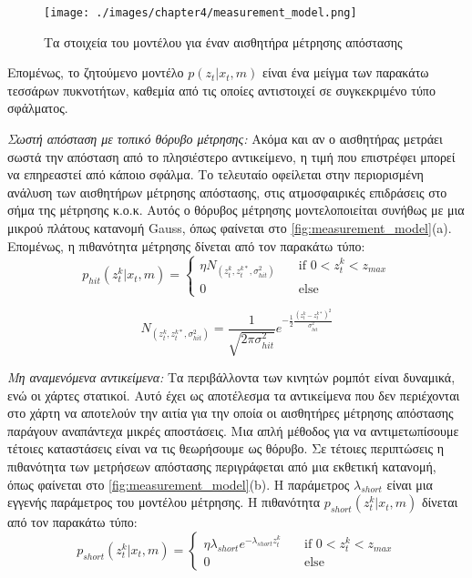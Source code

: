 \begin{figure}[!ht]
    \centering
    \texttt{[image: ./images/chapter4/measurement\_model.png]}
    \caption{Τα στοιχεία του μοντέλου για έναν αισθητήρα μέτρησης απόστασης}
    \label{fig:measurement_model}
\end{figure} 

Επομένως, το ζητούμενο μοντέλο $p(z_t | x_t, m)$ είναι ένα μείγμα των παρακάτω τεσσάρων πυκνοτήτων, καθεμία από τις οποίες αντιστοιχεί σε συγκεκριμένο τύπο σφάλματος.

\emph{Σωστή απόσταση με τοπικό θόρυβο μέτρησης:} Ακόμα και αν ο αισθητήρας μετράει σωστά την απόσταση από το πλησιέστερο αντικείμενο, η τιμή που επιστρέφει μπορεί να επηρεαστεί από κάποιο σφάλμα. Το τελευταίο οφείλεται στην περιορισμένη ανάλυση των αισθητήρων μέτρησης απόστασης, στις ατμοσφαιρικές επιδράσεις στο σήμα της μέτρησης κ.ο.κ. Αυτός ο θόρυβος μέτρησης μοντελοποιείται συνήθως με μια μικρού πλάτους κατανομή Gauss, όπως φαίνεται στο \autoref{fig:measurement_model}(a). Επομένως, η πιθανότητα μέτρησης δίνεται από τον παρακάτω τύπο:
\begin{equation*}
 p_{hit}(z_t^k | x_t, m) =
  \begin{cases}
    \eta N_(z_t^k, z_t^{k*}, \sigma_{hit}^2) & \quad \text{if } 0 < z_t^k < z_{max}\\
    0  & \quad \text{else}
  \end{cases}
\end{equation*}

\begin{equation*}
    N_(z_t^k, z_t^{k*}, \sigma_{hit}^2) = \frac{1}{\sqrt{2\pi\sigma_{hit}^2}} e^{-\frac{1}{2} \frac{(z_t^k - z_t^{k*})^2}{\sigma_{hit}^2} }
\end{equation*}

\emph{Μη αναμενόμενα αντικείμενα:} Τα περιβάλλοντα των κινητών ρομπότ είναι δυναμικά, ενώ οι χάρτες στατικοί. Αυτό έχει ως αποτέλεσμα τα αντικείμενα που δεν περιέχονται στο χάρτη να αποτελούν την αιτία για την οποία οι αισθητήρες μέτρησης απόστασης παράγουν αναπάντεχα μικρές αποστάσεις. Μια απλή μέθοδος για να αντιμετωπίσουμε τέτοιες καταστάσεις είναι να τις θεωρήσουμε ως θόρυβο. Σε τέτοιες περιπτώσεις η πιθανότητα των μετρήσεων απόστασης περιγράφεται από μια εκθετική κατανομή, όπως φαίνεται στο \autoref{fig:measurement_model}(b). Η παράμετρος $\lambda_{short}$ είναι μια εγγενής παράμετρος του μοντέλου μέτρησης. Η πιθανότητα $p_{short}(z_t^k | x_t, m)$ δίνεται από τον παρακάτω τύπο:
\begin{equation*}
 p_{short}(z_t^k | x_t, m) =
  \begin{cases}
    \eta \lambda_{short} e^{-\lambda_{short} z_t^k} & \quad \text{if } 0 < z_t^k < z_{max}\\
    0  & \quad \text{else}
  \end{cases}
\end{equation*}

